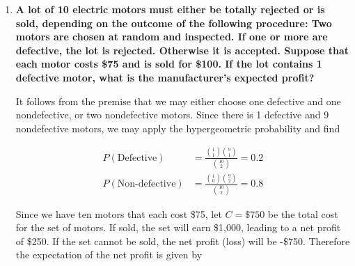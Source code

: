 \documentclass[10pt, oneside]{article}
\begin{document}
\begin{enumerate}[label=7.\arabic*]
Notice a pattern? Any particular outcome for any value of $X$ is $2/90$. We may generalize the probability that $X$ items must be chosen for inspection as

\[ P(X = n) = (n-1) \frac{2}{90} \]

The $n-1$ term represents that for whatever $X=n$, the last item must be defective by definition, for we say we inspected $X = n$ items when the $n$-th and final item we inspect turns out to be the second of the defective items. This then leaves $n-1$ unique ``outcomes" for the other defective item (namely, it can occupy the 1st, 2nd, ..., $n-1$-th position in the sequence of inspected items). Then the expected number of items that must be chosen for inspection for clearing the defective items is

\[ E[X] = \sum^{10}_{n=2} n(n-1) \frac{2}{90} = \boxed{ 7 \frac{1}{3} } \]

\textbf{Note:} Meyer lists $7 \frac{2}{15}$ as his answer. I disagree, unless an astute reader can identify if I have made an error. 

\item  \begin{tcolorbox}[
  colback=Cerulean!5!white,
  colframe=Cerulean!75!black]
\textbf{A lot of 10 electric motors must either be totally rejected or is sold, depending on the outcome of the following procedure: Two motors are chosen at random and inspected. If one or more are defective, the lot is rejected. Otherwise it is accepted. Suppose that each motor costs \$75 and is sold for \$100. If the lot contains 1 defective motor, what is the manufacturer's expected profit?}
\end{tcolorbox}

It follows from the premise that we may either choose one defective and one nondefective, or two nondefective motors. Since there is 1 defective and 9 nondefective motors, we may apply the hypergeometric probability and find

\begin{align*}
P(\text{Defective}) &= \frac{\binom{1}{1} \binom{9}{1}}{\binom{10}{2}} = 0.2 \\
P(\text{Non-defective}) &= \frac{\binom{1}{0} \binom{9}{2}}{\binom{10}{2}} = 0.8
\end{align*}

Since we have ten motors that each cost \$75, let $C = \$750$ be the total cost for the set of motors. If sold, the set will earn \$1,000, leading to a net profit of \$250. If the set cannot be sold, the net profit (loss) will be -\$750. Therefore the expectation of the net profit is given by


\end{enumerate}
\end{document}

